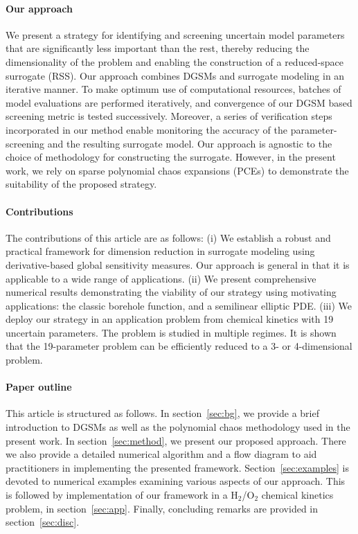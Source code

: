 \paragraph{Our approach}
We present a strategy for identifying and screening uncertain model parameters
that are significantly less important than the rest, thereby reducing the
dimensionality of the problem and enabling the construction of a reduced-space
surrogate (RSS).  Our approach combines DGSMs and surrogate modeling in an
iterative manner.  To make optimum use of computational resources, batches of
model evaluations are performed iteratively, and convergence of our DGSM based
screening metric is tested successively. Moreover, a series of verification steps
incorporated in our method enable monitoring the accuracy of the parameter-screening
and the resulting surrogate model.  Our approach is agnostic to the choice of
methodology for constructing the surrogate. However, in the present work, we
rely on sparse polynomial chaos expansions (PCEs) 
to demonstrate the suitability of the proposed strategy.  



\paragraph{Contributions}
The contributions of this article are as follows: (i) We establish a robust and
practical framework for dimension reduction in surrogate modeling using
derivative-based global sensitivity measures. Our
approach is general in that it is applicable to a wide range of applications.
(ii) We present comprehensive numerical results demonstrating the viability of
our strategy using motivating applications: the classic borehole
function, and a semilinear elliptic PDE.  (iii) We 
deploy our strategy in an application problem from chemical kinetics with 19
uncertain parameters. The problem is studied in multiple regimes.
It is shown that the 19-parameter problem can be efficiently reduced to a 3- 
or 4-dimensional problem.

\paragraph{Paper outline}
This article is structured as follows. In section~\ref{sec:bg}, we provide a
brief introduction to DGSMs as well as the polynomial chaos methodology used in
the present work.  In section~\ref{sec:method}, we present our proposed
approach. There we also provide a detailed numerical algorithm and a flow
diagram to aid practitioners in implementing the presented framework.
Section~\ref{sec:examples} is devoted to numerical examples
examining various aspects of our approach. This is followed by implementation
of our framework in a H$_2$/O$_2$ chemical kinetics problem, in section~\ref{sec:app}.
Finally, concluding remarks are provided in section~\ref{sec:disc}.


